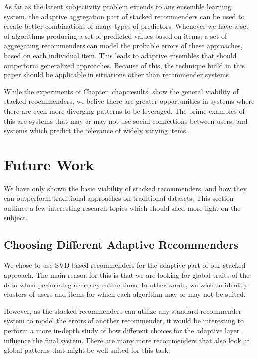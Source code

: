 As far as the latent subjectivity problem extends to any ensemble learning system,
the adaptive aggregation part of stacked recommenders can be used to 
create better combinations of many types of predictors.
Whenever we have a set of algorithms producing a set of predicted values
based on items, a set of aggregating recommenders can model the probable
errors of these approaches, based on each individual item.
This leads to adaptive ensembles that should outperform generalized approaches.
Because of this, the technique build in this paper should be 
applicable in situations other than recommender systems.

While the experiments of Chapter \ref{chap:results} show the general viability of stacked reocmmenders,
we belive there are greater opportunities in systems where there  are even more diverging
patterns to be leveraged. The prime examples of this are systems that may or may 
not use social connections between users, and systems which predict the 
relevance of widely varying items.


\section{Future Work}      

We have only shown the basic viability of stacked recommenders,
and how they can outperform traditional approaches on traditional datasets.
This section outlines a few interesting research topics
which should shed more light on the subject.

\subsection{Choosing Different Adaptive Recommenders}

We chose to use SVD-based recommenders for the adaptive part of our stacked approach.
The main reason for this is that we are looking for global traits of the data
when performing accuracy estimations. In other words, we wish to identify
clusters of users and items for which each algorithm may or may not be suited.

However, as the stacked recommenders can utilize any standard recommender system
to model the errors of another recommender, it would be interesting to perform
a more in-depth study of how different choices for the adaptive layer
influence the final system.
There are many more recommenders that also look at global patterns
that might be well suited for this task.

